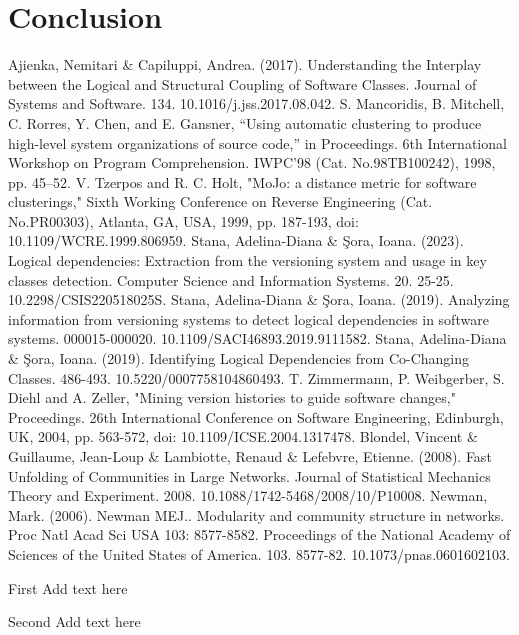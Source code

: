 \documentclass{ieeeaccess}
\begin{document}
\section{Conclusion}
\label{sec:conclusion}

\begin{thebibliography}{00}

 Ajienka, Nemitari \& Capiluppi, Andrea. (2017). Understanding the Interplay between the Logical and Structural Coupling of Software Classes. Journal of Systems and Software. 134. 10.1016/j.jss.2017.08.042.
 S. Mancoridis, B. Mitchell, C. Rorres, Y. Chen, and E. Gansner, “Using automatic clustering to produce high-level system organizations of source code,” in Proceedings. 6th International Workshop on Program Comprehension. IWPC’98 (Cat. No.98TB100242), 1998, pp. 45–52.
 V. Tzerpos and R. C. Holt, "MoJo: a distance metric for software clusterings," Sixth Working Conference on Reverse Engineering (Cat. No.PR00303), Atlanta, GA, USA, 1999, pp. 187-193, doi: 10.1109/WCRE.1999.806959.
 Stana, Adelina-Diana \& Şora, Ioana. (2023). Logical dependencies: Extraction from the versioning system and usage in key classes detection. Computer Science and Information Systems. 20. 25-25. 10.2298/CSIS220518025S. 
 Stana, Adelina-Diana \& Şora, Ioana. (2019). Analyzing information from versioning systems to detect logical dependencies in software systems. 000015-000020. 10.1109/SACI46893.2019.9111582. 
 Stana, Adelina-Diana \& Şora, Ioana. (2019). Identifying Logical Dependencies from Co-Changing Classes. 486-493. 10.5220/0007758104860493. 
 T. Zimmermann, P. Weibgerber, S. Diehl and A. Zeller, "Mining version histories to guide software changes," Proceedings. 26th International Conference on Software Engineering, Edinburgh, UK, 2004, pp. 563-572, doi: 10.1109/ICSE.2004.1317478.
 Blondel, Vincent \& Guillaume, Jean-Loup \& Lambiotte, Renaud \& Lefebvre, Etienne. (2008). Fast Unfolding of Communities in Large Networks. Journal of Statistical Mechanics Theory and Experiment. 2008. 10.1088/1742-5468/2008/10/P10008. 
 Newman, Mark. (2006). Newman MEJ.. Modularity and community structure in networks. Proc Natl Acad Sci USA 103: 8577-8582. Proceedings of the National Academy of Sciences of the United States of America. 103. 8577-82. 10.1073/pnas.0601602103. 


\end{thebibliography}

\begin{IEEEbiographynophoto}{First} Add text here
\end{IEEEbiographynophoto}

\begin{IEEEbiographynophoto}{Second} Add text here
\end{IEEEbiographynophoto}

\EOD
\end{document}
